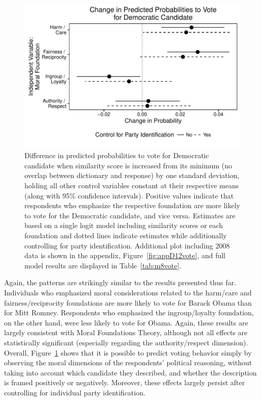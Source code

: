 \documentclass[12pt]{article}
\begin{document}
\begin{figure}[h]\centering
\includegraphics[scale=.9]{../calc/fig/fig8vote.pdf}
\caption{Difference in predicted probabilities to vote for Democratic candidate when similarity score is increased from its minimum (no overlap between dictionary and response) by one standard deviation, holding all other control variables constant at their respective means (along with 95\% confidence intervals). Positive values indicate that respondents who emphasize the respective foundation are more likely to vote for the Democratic candidate, and vice versa. Estimates are based on a single logit model including similarity scores or each foundation and dotted lines indicate estimates while additionally controlling for party identification. Additional plot including 2008 data is shown in the appendix, Figure~\ref{fig:appD12vote}, and full model results are displayed in Table~\ref{tab:m8vote}.}\label{fig:8vote}
\end{figure}

Again, the patterns are strikingly similar to the results presented thus far. Individuals who emphasized moral considerations related to the harm/care and fairness/reciprocity foundations are more likely to vote for Barack Obama than for Mitt Romney. Respondents who emphasized the ingroup/loyalty foundation, on the other hand, were less likely to vote for Obama. Again, these results are largely consistent with Moral Foundations Theory, although not all effects are statistically significant (especially regarding the authority/respect dimension). Overall, Figure~\ref{fig:8vote} shows that it is possible to predict voting behavior simply by observing the moral dimensions of the respondents' political reasoning, without taking into account which candidate they described, and whether the description is framed positively or negatively. Moreover, these effects largely persist after controlling for individual party identification.
\end{document}
